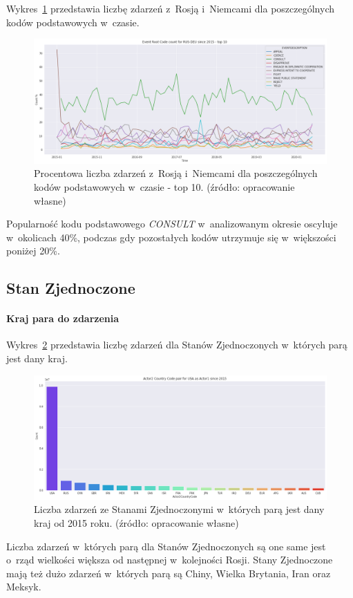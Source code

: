 \documentclass[11pt]{report}
\begin{document}
    Wykres~\ref{fig:RUSRUSERC} przedstawia liczbę zdarzeń z~Rosją i~Niemcami dla poszczególnych kodów podstawowych w~czasie.
    \begin{figure}[!htp]
        \centering
        \includegraphics[width=\linewidth]{fig/RUS/RUSDEUERCperc.png}
        \caption{Procentowa liczba zdarzeń z~Rosją i~Niemcami dla poszczególnych kodów podstawowych w~czasie - top 10. (źródło: opracowanie własne)}
        \label{fig:RUSRUSERC}
    \end{figure}
    Popularność kodu podstawowego \textit{CONSULT} w~analizowanym okresie oscyluje w~okolicach 40\%, podczas gdy pozostałych kodów utrzymuje się w~większości poniżej 20\%.

    \subsection{Stan Zjednoczone}

    \paragraph{Kraj para do zdarzenia}

    Wykres~\ref{fig:USApair} przedstawia liczbę zdarzeń dla Stanów Zjednoczonych w~których parą jest dany kraj.

    \begin{figure}[!htp]
        \centering
        \includegraphics[width=\linewidth]{fig/USA/USAactor2Pair.png}
        \caption{Liczba zdarzeń ze Stanami Zjednoczonymi w~których parą jest dany kraj od 2015 roku. (źródło: opracowanie własne)}
        \label{fig:USApair}
    \end{figure}
    Liczba zdarzeń w~których parą dla Stanów Zjednoczonych są one same jest o~rząd wielkości większa od następnej w~kolejności Rosji.
    Stany Zjednoczone mają też dużo zdarzeń w~których parą są Chiny, Wielka Brytania, Iran oraz Meksyk.
\end{document}
